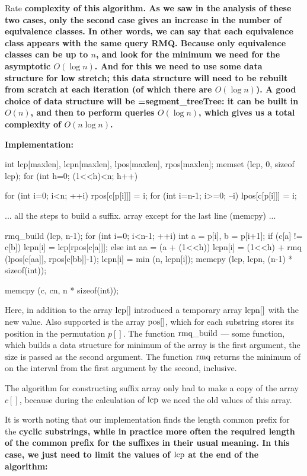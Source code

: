 Rate \bf{complexity} of this algorithm. As we saw in the analysis of these two cases, only the second case gives an increase in the number of equivalence classes. In other words, we can say that each equivalence class appears with the same query RMQ. Because only equivalence classes can be up to $n$, and look for the minimum we need for the asymptotic $O(\log n)$. And for this we need to use some data structure for low stretch; this data structure will need to be rebuilt from scratch at each iteration (of which there are $O(\log n)$). A good choice of data structure will be \bf{\algohref=segment_tree{Tree}}: it can be built in $O(n)$, and then to perform queries $O(\log n)$, which gives us a total complexity of $O(n \log n)$.

\bf{Implementation:}

\code
int lcp[maxlen], lcpn[maxlen], lpos[maxlen], rpos[maxlen];
memset (lcp, 0, sizeof lcp);
for (int h=0; (1<<h)<n; h++) {
for (int i=0; i<n; ++i)
rpos[c[p[i]]] = i;
for (int i=n-1; i>=0; --i)
lpos[c[p[i]]] = i;

... all the steps to build a suffix. array except for the last line (memcpy) ...

rmq_build (lcp, n-1);
for (int i=0; i<n-1; ++i) {
int a = p[i], b = p[i+1];
if (c[a] != c[b])
lcpn[i] = lcp[rpos[c[a]]];
else {
int aa = (a + (1<<h)) %
lcpn[i] = (1<<h) + rmq (lpos[c[aa]], rpos[c[bb]]-1);
lcpn[i] = min (n, lcpn[i]);
}
}
memcpy (lcp, lcpn, (n-1) * sizeof(int));

memcpy (c, cn, n * sizeof(int));
}
\endcode

Here, in addition to the array $\rm lcp[]$ introduced a temporary array $\rm lcpn[]$ with the new value. Also supported is the array $\rm pos[]$, which for each substring stores its position in the permutation $p[]$. The function $\rm rmq\_build$ --- some function, which builds a data structure for minimum of the array is the first argument, the size is passed as the second argument. The function $\rm rmq$ returns the minimum of on the interval from the first argument by the second, inclusive.

The algorithm for constructing suffix array only had to make a copy of the array $c[]$, because during the calculation of $\rm lcp$ we need the old values of this array.

It is worth noting that our implementation finds the length common prefix for the \bf{cyclic substrings}, while in practice more often the required length of the common prefix for the suffixes in their usual meaning. In this case, we just need to limit the values of $\rm lcp$ at the end of the algorithm:

